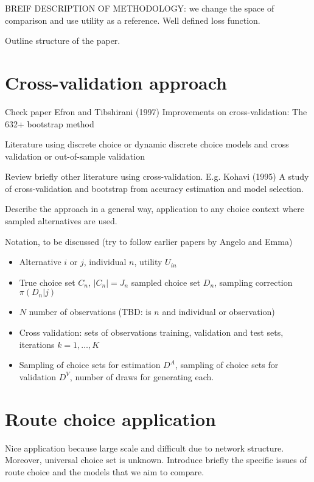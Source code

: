 \documentclass[12pt,a4paper]{article}
\begin{document}
BREIF DESCRIPTION OF METHODOLOGY: we change the space of comparison and use utility as a reference. Well defined loss function. 

Outline structure of the paper.

\section{Cross-validation approach} \label{sec:cross validation}

Check paper Efron and Tibshirani (1997) Improvements on cross-validation: The 632+ bootstrap method

Literature using discrete choice or dynamic discrete choice models and cross validation or out-of-sample validation
\cite{KeanWolp07}

Review briefly other literature using cross-validation. E.g. Kohavi (1995) A study of cross-validation and bootstrap from accuracy estimation and model selection.

Describe the approach in a general way, application to any choice context where sampled alternatives are used.

Notation, to be discussed (try to follow earlier papers by Angelo and Emma)
\begin{itemize}
\item Alternative $i$ or $j$, individual $n$, utility $U_{in}$
\item True choice set $C_n$, $|C_n|=J_n$ sampled choice set $D_n$, sampling correction $\pi(D_n|j)$
\item $N$ number of observations (TBD: is $n$ and individual or observation)
\item Cross validation: sets of observations training, validation and test sets, iterations $k=1,\ldots,K$
\item Sampling of choice sets for estimation $D^A$, sampling of choice sets for validation $D^V$, number of draws for generating each.
\end{itemize}



\section{Route choice application} \label{sec:routechoice}
Nice application because large scale and difficult due to network structure. Moreover, universal choice set is unknown. Introduce briefly the specific issues of route choice and the models that we aim to compare.
\end{document}
